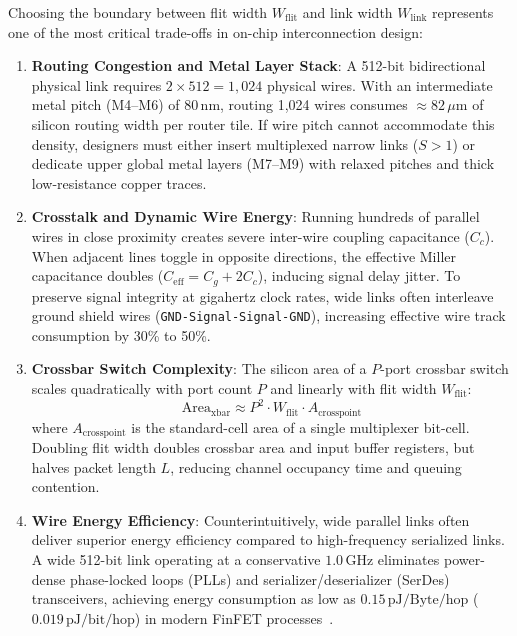 Choosing the boundary between flit width $W_{\text{flit}}$ and link width $W_{\text{link}}$ represents one of the most critical trade-offs in on-chip interconnection design:
\begin{enumerate}
    \item \textbf{Routing Congestion and Metal Layer Stack}:
    A 512-bit bidirectional physical link requires $2 \times 512 = 1,024$ physical wires. With an intermediate metal pitch (M4--M6) of $80\,\mathrm{nm}$, routing 1,024 wires consumes $\approx 82\,\mu\mathrm{m}$ of silicon routing width per router tile. If wire pitch cannot accommodate this density, designers must either insert multiplexed narrow links ($S > 1$) or dedicate upper global metal layers (M7--M9) with relaxed pitches and thick low-resistance copper traces.
    \item \textbf{Crosstalk and Dynamic Wire Energy}:
    Running hundreds of parallel wires in close proximity creates severe inter-wire coupling capacitance ($C_c$). When adjacent lines toggle in opposite directions, the effective Miller capacitance doubles ($C_{\text{eff}} = C_g + 2C_c$), inducing signal delay jitter. To preserve signal integrity at gigahertz clock rates, wide links often interleave ground shield wires (\texttt{GND-Signal-Signal-GND}), increasing effective wire track consumption by 30\% to 50\%.
    \item \textbf{Crossbar Switch Complexity}:
    The silicon area of a $P$-port crossbar switch scales quadratically with port count $P$ and linearly with flit width $W_{\text{flit}}$:
    \begin{equation}
    \text{Area}_{\text{xbar}} \approx P^2 \cdot W_{\text{flit}} \cdot A_{\text{crosspoint}}
    \label{eq:ch2_xbar_area}
    \end{equation}
    where $A_{\text{crosspoint}}$ is the standard-cell area of a single multiplexer bit-cell. Doubling flit width doubles crossbar area and input buffer registers, but halves packet length $L$, reducing channel occupancy time and queuing contention.
    \item \textbf{Wire Energy Efficiency}:
    Counterintuitively, wide parallel links often deliver superior energy efficiency compared to high-frequency serialized links. A wide 512-bit link operating at a conservative $1.0\,\mathrm{GHz}$ eliminates power-dense phase-locked loops (PLLs) and serializer/deserializer (SerDes) transceivers, achieving energy consumption as low as $0.15\,\mathrm{pJ/Byte/hop}$ ($0.019\,\mathrm{pJ/bit/hop}$) in modern FinFET processes~\cite{Fischer2025}.
\end{enumerate}

